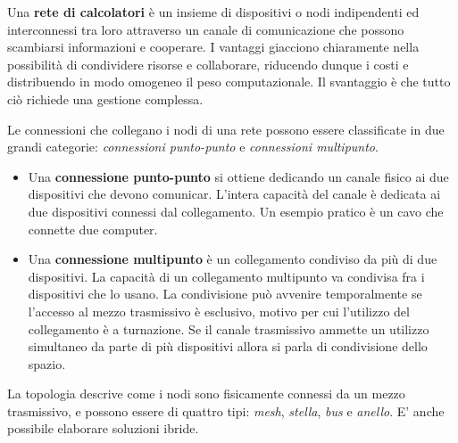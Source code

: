 Una \textbf{rete di calcolatori} è un insieme di dispositivi o nodi indipendenti ed interconnessi tra loro attraverso un canale di comunicazione che possono scambiarsi informazioni e cooperare. I vantaggi giacciono chiaramente nella possibilità di condividere risorse e collaborare, riducendo dunque i costi e distribuendo in modo omogeneo il peso computazionale. Il svantaggio è che tutto ciò richiede una gestione complessa.

\vspace{3mm}

Le connessioni che collegano i nodi di una rete possono essere classificate in due
grandi categorie: \textit{connessioni punto-punto} e \textit{connessioni multipunto}.

\begin{itemize}
    \item 
    Una \textbf{connessione punto-punto} si ottiene dedicando un canale fisico ai due dispositivi che devono comunicar. L’intera capacità del canale è dedicata ai due dispositivi connessi dal
    collegamento. Un esempio pratico è un cavo che connette due computer.
    
    \item
    Una \textbf{connessione multipunto} è un collegamento condiviso da più di due dispositivi. La capacità di un collegamento multipunto va condivisa fra i dispositivi che lo usano. La condivisione può avvenire temporalmente se l’accesso al mezzo trasmissivo è esclusivo, motivo per cui l'utilizzo del collegamento è a turnazione. Se il canale trasmissivo ammette un utilizzo simultaneo da parte di più dispositivi allora si parla di condivisione dello spazio.
\end{itemize}

La topologia descrive come i nodi sono fisicamente connessi da un mezzo trasmissivo, e possono essere di quattro tipi: \textit{mesh}, \textit{stella}, \textit{bus} e \textit{anello}. E' anche possibile elaborare soluzioni ibride.

